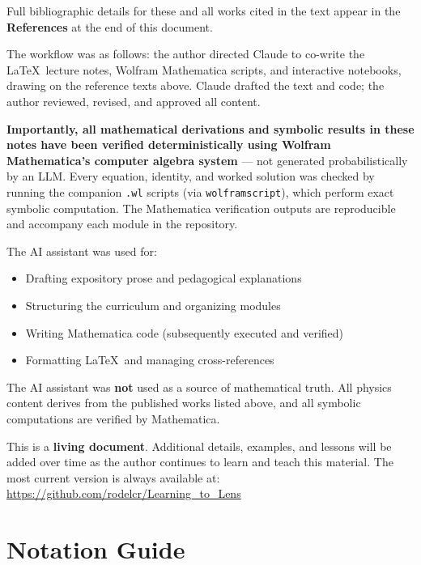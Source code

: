 \documentclass[12pt,letterpaper,twoside]{report}
\begin{document}
\medskip
\noindent
Full bibliographic details for these and all works cited in the text appear
in the \textbf{References} at the end of this document.

\medskip
\noindent
The workflow was as follows: the author directed Claude to co-write the
\LaTeX\ lecture notes, Wolfram Mathematica scripts, and interactive
notebooks, drawing on the reference texts above.
Claude drafted the text and code; the author reviewed, revised, and
approved all content.

\medskip
\noindent
\textbf{Importantly, all mathematical derivations and symbolic results
in these notes have been verified deterministically using Wolfram
Mathematica's computer algebra system} --- not generated probabilistically
by an LLM\@.  Every equation, identity, and worked solution was checked
by running the companion \texttt{.wl} scripts (via \texttt{wolframscript}),
which perform exact symbolic computation.  The Mathematica verification
outputs are reproducible and accompany each module in the repository.

\medskip
\noindent
The AI assistant was used for:
\begin{itemize}[nosep]
    \item Drafting expository prose and pedagogical explanations
    \item Structuring the curriculum and organizing modules
    \item Writing Mathematica code (subsequently executed and verified)
    \item Formatting \LaTeX\ and managing cross-references
\end{itemize}

\noindent
The AI assistant was \textbf{not} used as a source of mathematical truth.
All physics content derives from the published works listed above, and all
symbolic computations are verified by Mathematica.

\medskip
\noindent
This is a \textbf{living document}.  Additional details, examples, and
lessons will be added over time as the author continues to learn and teach
this material.  The most current version is always available at:
\url{https://github.com/rodelcr/Learning_to_Lens}

\vspace*{\fill}
\clearpage

\tableofcontents
\listoffigures

\chapter*{Notation Guide}
\end{document}
